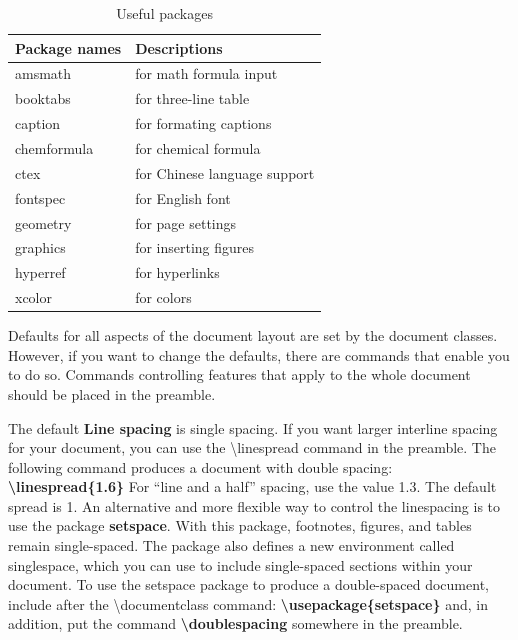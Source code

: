 \documentclass[12pt,openright]{book}
\begin{document}
\begin{table}[!htbp]
    \caption{Useful packages}
    \label{tab:useful packages}
    \centering
    \begin{tabular}{@{}p{}p{}@{}}
      \toprule
      \textbf{Package names} & \textbf{Descriptions}  \\ 
      \midrule
      amsmath	& for math formula input \\
      booktabs & for three-line table \\
      caption & for formating captions \\
      chemformula & for chemical formula \\
      ctex & for Chinese language support \\
      fontspec & for English font \\
      geometry & for page settings \\
      graphics & for inserting figures \\
      hyperref & for hyperlinks \\
      xcolor & for colors \\
      \bottomrule
    \end{tabular}
\end{table}

Defaults for all aspects of the document layout are set by the document classes. However, if you want to change the defaults, there are commands that enable you to do so. Commands controlling features that apply to the whole document should be placed in
the preamble.

The default \textbf{Line spacing} is single spacing. If you want larger interline spacing for your document, you can use the \textbackslash linespread command in the preamble. The following command produces a document with double spacing: \textbf{\textbackslash linespread\{1.6\}} For “line and a half” spacing, use the value 1.3. The default spread is 1. An alternative and more flexible way to control the linespacing is to use the package \textbf{setspace}. With this package, footnotes, figures, and tables remain single-spaced. The package also defines a new environment called singlespace, which you can use to include single-spaced sections within your document. To use the setspace package to produce a double-spaced document, include after the \textbackslash documentclass command: \textbf{\textbackslash usepackage\{setspace\}} and, in addition, put the command \textbf{\textbackslash doublespacing} somewhere in the preamble.
\end{document}
